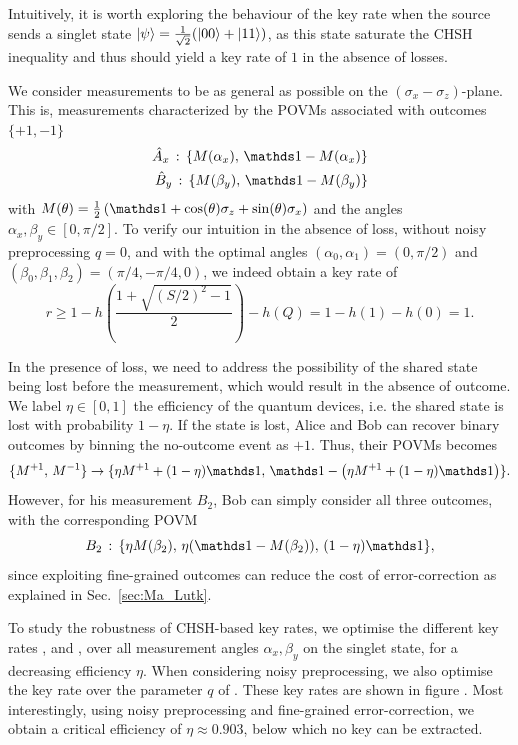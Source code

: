 \medbreak

Intuitively, it is worth exploring the behaviour of the key rate when the source sends a singlet state $\ket{\psi}=\frac{1}{\sqrt{2}}(\ket{00}+\ket{11})$, as this state saturate the CHSH inequality and thus should yield a key rate of $1$ in the absence of losses.

We consider measurements to be as general as possible on the $(\sigma_x-\sigma_z)$-plane. This is, measurements characterized by the POVMs associated with outcomes $\{+1,-1\}$
\begin{equation}
	\begin{split}
		\hat{A}_x\,:\, \{M(\alpha_x),\, \id-M(\alpha_x)\} \\
		\hat{B}_y\,:\, \{M(\beta_y),\, \id-M(\beta_y)\}
	\end{split}	
\end{equation}
with $M(\theta) = \frac{1}{2}\left(\id + \cos(\theta)\sigma_z + \sin(\theta)\sigma_x \right)$ and the angles $\alpha_x,\beta_y\in[0,\pi/2]$.
To verify our intuition in the absence of loss, without noisy preprocessing $q=0$, and with the optimal angles $(\alpha_0,\alpha_1)=(0,\pi/2)$ and $(\beta_0,\beta_1,\beta_2)=(\pi/4,-\pi/4,0)$, we indeed obtain a key rate of
\begin{equation}
	r \geq 1-h\left(\frac{1+\sqrt{(S/2)^2-1}}{2}\right)-h(Q) = 1 - h(1) - h(0) = 1.
\end{equation}

In the presence of loss, we need to address the possibility of the shared state being lost before the measurement, which would result in the absence of outcome.
We label $\eta\in[0,1]$ the efficiency of the quantum devices, i.e. the shared state is lost with probability $1-\eta$.
If the state is lost, Alice and Bob can recover binary outcomes by binning the no-outcome event as $+1$.
Thus, their POVMs becomes
\begin{equation}
	\{M^{+1},\,M^{-1}\} \rightarrow \{\eta M^{+1}+(1-\eta) \id,\, \id-\left(\eta M^{+1}+(1-\eta) \id\right)\}.
\end{equation}
However, for his measurement $B_2$, Bob can simply consider all three outcomes, with the corresponding POVM
\begin{equation}
	B_2\, : \, \{\eta M(\beta_2),\, \eta (\id-M(\beta_2)),\, (1-\eta) \id \},
\end{equation}
since exploiting fine-grained outcomes can reduce the cost of error-correction as explained in Sec.~\ref{sec:Ma_Lutk}.

To study the robustness of CHSH-based key rates, we optimise the different key rates ,  and , over all measurement angles $\alpha_x,\beta_y$ on the singlet state, for a decreasing efficiency $\eta$. 
When considering noisy preprocessing, we also optimise the key rate over the parameter $q$ of .
These key rates are shown in figure . 
Most interestingly, using noisy preprocessing and fine-grained error-correction, we obtain a critical efficiency of $\eta \approx 0.903$, below which no key can be extracted.


